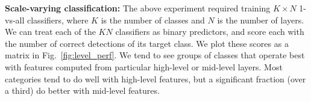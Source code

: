\documentclass[10pt,twocolumn,letterpaper]{article}
\begin{document}

{\bf Scale-varying classification:} The above experiment required training $K \times N$ 1-vs-all classifiers, where $K$ is the number of classes and $N$ is the number of layers. We can treat each of the $KN$ classifiers as binary predictors, and score each with the number of correct detections of its target class. We plot these scores as a matrix in Fig.~\ref{fig:level_perf}. We tend to see groups of classes that operate best with features computed from particular high-level or mid-level layers. %
Most categories tend to do well with high-level features, but a significant fraction (over a third) do better with mid-level features.
\end{document}
